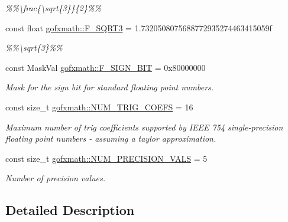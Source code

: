 \begin{DoxyCompactItemize}
\begin{DoxyCompactList}\small\item\em \%\%\textbackslash{}frac\{\textbackslash{}sqrt\{3\}\}\{2\}\%\% \end{DoxyCompactList}\item 
\hypertarget{group___scalar_math_consts_ga1a5c35ecfaa4a8bbb408287ab3d38248}{}const float \hyperlink{group___scalar_math_consts_ga1a5c35ecfaa4a8bbb408287ab3d38248}{gofxmath\+::\+F\+\_\+\+S\+Q\+R\+T3} = 1.\+7320508075688772935274463415059f\label{group___scalar_math_consts_ga1a5c35ecfaa4a8bbb408287ab3d38248}

\begin{DoxyCompactList}\small\item\em \%\%\textbackslash{}sqrt\{3\}\%\% \end{DoxyCompactList}\item 
const Mask\+Val \hyperlink{group___scalar_math_consts_gae9346089acea1670286e7cbe27bdbbbb}{gofxmath\+::\+F\+\_\+\+S\+I\+G\+N\+\_\+\+B\+I\+T} = 0x80000000
\begin{DoxyCompactList}\small\item\em Mask for the sign bit for standard floating point numbers. \end{DoxyCompactList}\item 
const size\+\_\+t \hyperlink{group___scalar_math_consts_gab7b8a16b47f0cca40952e44fdd24f87d}{gofxmath\+::\+N\+U\+M\+\_\+\+T\+R\+I\+G\+\_\+\+C\+O\+E\+F\+S} = 16
\begin{DoxyCompactList}\small\item\em Maximum number of trig coefficients supported by I\+E\+E\+E 754 single-\/precision floating point numbers -\/ assuming a taylor approximation. \end{DoxyCompactList}\item 
\hypertarget{group___scalar_math_consts_ga5c411f18f77bce82247b32ea257204fb}{}const size\+\_\+t \hyperlink{group___scalar_math_consts_ga5c411f18f77bce82247b32ea257204fb}{gofxmath\+::\+N\+U\+M\+\_\+\+P\+R\+E\+C\+I\+S\+I\+O\+N\+\_\+\+V\+A\+L\+S} = 5\label{group___scalar_math_consts_ga5c411f18f77bce82247b32ea257204fb}

\begin{DoxyCompactList}\small\item\em Number of precision values. \end{DoxyCompactList}\end{DoxyCompactItemize}


\subsection{Detailed Description}


